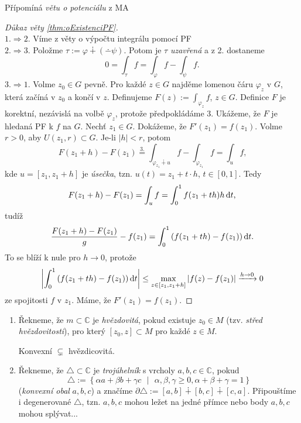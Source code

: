 \begin{note}
Přípomíná \emph{větu o potenciálu} z MA 
\end{note}

\begin{proof}[Důkaz věty \cref{thm:oExistenciPF}]
\mbox{}\\
$1. \Rightarrow 2.$ Víme z věty o výpočtu integrálu pomocí PF\\
$2. \Rightarrow 3.$ Položme $\tau:=\varphi \dotplus(\dotminus\psi)$. Potom je $\tau$ \emph{uzavřená} a z 2. dostaneme $$0=\int_\tau f=\int_\varphi f - \int_\psi f\text{.}$$
$3. \Rightarrow 1.$ Volme $z_0\in G$ pevně. Pro každé $z\in G$ najděme lomenou čáru $\varphi_z$ v $G$, která začíná v $z_0$ a končí v $z$. 
Definujeme $F(z):=\int_{\varphi_z} f$, $z\in G$. 
Definice $F$ je korektní, nezávislá na volbě $\varphi_z$, protože předpokládáme 3. Ukážeme, že $F$ je hledaná PF k $f$ na $G$. Nechť $z_1\in G$. Dokážeme, že $F'(z_1)=f(z_1)$. 
Volme $r>0$, aby $U(z_1,r)\subset G$. Je-li $|h|<r$, 
potom $$F(z_1+h)-F(z_1)\stackrel{3.}{=}\int_{\varphi_{z_1}\dotplus u} f-\int_{\varphi_{z_1}}f=\int_u f\text{,}$$
kde $u=\left[z_1,z_1+h \right]$ je \emph{úsečka}, tzn. $u(t)=z_1+t\cdot h$, $t\in[0,1]$. 
Tedy $$F(z_1+h)-F(z_1)=\int_u f=\int_0^1 f(z_1+th)h \mathop{}\!\mathrm{d} t\text{,}$$tudíž $$\frac{F(z_1+h)-F(z_1)}{g}-f(z_1)=\int_0^1 \left(f(z_1+th)-f(z_1)\right)\mathop{}\!\mathrm{d} t\text{.}$$ To se blíží k nule pro $h\rightarrow0$, protože 
$$\left| \int_0^1\left(f(z_1+th)-f(z_1)\right)\mathop{}\!\mathrm{d} t\right| \leq \max_{z\in[z_1,z_1+h]}\left|f(z)-f(z_1)\right| \xrightarrow{ h\rightarrow 0}0$$
ze spojitosti $f$ v $z_1$. Máme, že $F'(z_1)=f(z_1)$.
\end{proof}

\begin{notation}
\mbox{}
\begin{enumerate}
    \item 
        Řekneme, že $m\subset\mathbb{C}$ je \emph{hvězdovitá}, pokud existuje $z_0\in M$ (tzv. \emph{střed hvězdovitosti}), pro který $[z_0,z]\subset M$ pro každé $z\in M$.
        \begin{note*}
            Konvexní $\subsetneq$ hvězdicovitá.
        \end{note*}
    \item
        Řekneme, že $\triangle\subset\mathbb{C}$ 
        je \emph{trojúhelník} s vrcholy $a,b,c\in\mathbb{C}$, 
        pokud $$\triangle:=\left\{ \alpha a+\beta b + \gamma c\text{ }|\text{ }\alpha,\beta,\gamma\geq 0,\alpha+\beta+\gamma=1 \right\}$$ (\emph{konvexní obal }$a,b,c$) a značíme
        $\partial\triangle:=[a,b]\dotplus[b,c]\dotplus[c,a]$. 
        Připouštíme i degenerované $\triangle$, tzn. $a,b,c$ mohou ležet na jedné přímce nebo body $a,b,c$ mohou splývat...
\end{enumerate}
\end{notation}

